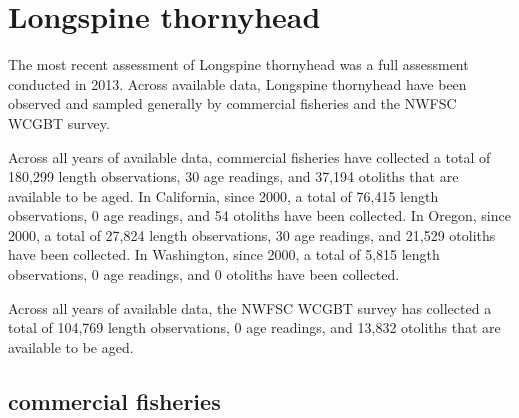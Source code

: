 \documentclass[11pt,
  english,
  letterpaper,
]{article}
\begin{document}

\hypertarget{longspine-thornyhead}{%
\section{Longspine thornyhead}\label{longspine-thornyhead}}

\leavevmode\tagmcend\tagstructend


The most recent assessment of Longspine thornyhead was a full assessment conducted in 2013. Across available data, Longspine thornyhead have been observed and sampled generally by commercial fisheries and the NWFSC WCGBT survey.

\leavevmode\tagmcend\tagstructend\par


Across all years of available data, commercial fisheries have collected a total of 180,299 length observations, 30 age readings, and 37,194 otoliths that are available to be aged. In California, since 2000, a total of 76,415 length observations, 0 age readings, and 54 otoliths have been collected. In Oregon, since 2000, a total of 27,824 length observations, 30 age readings, and 21,529 otoliths have been collected. In Washington, since 2000, a total of 5,815 length observations, 0 age readings, and 0 otoliths have been collected.

\leavevmode\tagmcend\tagstructend\par


Across all years of available data, the NWFSC WCGBT survey has collected a total of 104,769 length observations, 0 age readings, and 13,832 otoliths that are available to be aged.

\leavevmode\tagmcend\tagstructend\par


\hypertarget{commercial-fisheries-30}{%
\subsection{commercial fisheries}\label{commercial-fisheries-30}}

\leavevmode\tagmcend\tagstructend

\end{document}
